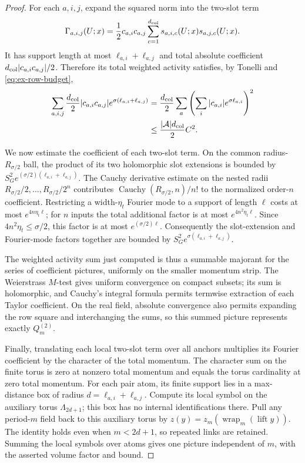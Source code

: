 \begin{proof}
For each $a,i,j$, expand the squared norm into the two-slot term
\[
 \Gamma_{a,i,j}(U;x)=\frac12c_{a,i}c_{a,j}
       \sum_{c=1}^{d_{\rm col}}s_{a,i,c}(U;x)s_{a,j,c}(U;x).
\]
It has support length at most $\ell_{a,i}+\ell_{a,j}$ and total absolute
coefficient $d_{\rm col}|c_{a,i}c_{a,j}|/2$. Therefore its total weighted
activity satisfies, by Tonelli and \eqref{eq:ex-row-budget},
\[
 \begin{aligned}
 \sum_{a,i,j}\frac{d_{\rm col}}2|c_{a,i}c_{a,j}|
          e^{\sigma(\ell_{a,i}+\ell_{a,j})}
 &=\frac{d_{\rm col}}2\sum_a
       \left(\sum_i|c_{a,i}|e^{\sigma\ell_{a,i}}\right)^2\\
 &\leq \frac{|\mathcal A|d_{\rm col}}2C^2.
 \end{aligned}
\]

We now estimate the coefficient of each two-slot term. On the common
radius-$R_{\sigma/2}$ ball, the product of its two holomorphic slot extensions
is bounded by
$S_G^2e^{(\sigma/2)(\ell_{a,i}+\ell_{a,j})}$. The Cauchy derivative
estimate on the nested radii
$R_{\sigma/2}/2,\ldots,R_{\sigma/2}/2^n$ contributes
$\operatorname{Cauchy}(R_{\sigma/2},n)/n!$ to the normalized order-$n$
coefficient. Restricting a width-$\eta_t$ Fourier mode to a support of length
$\ell$ costs at most $e^{4n\eta_t\ell}$; for $n$ inputs the total additional
factor is at most $e^{4n^2\eta_t\ell}$. Since
$4n^2\eta_t\leq\sigma/2$, this factor is at most $e^{(\sigma/2)\ell}$.
Consequently the slot-extension and Fourier-mode factors together are bounded
by $S_G^2e^{\sigma(\ell_{a,i}+\ell_{a,j})}$.

The weighted activity sum just computed is thus a summable majorant for the
series of coefficient pictures, uniformly on the smaller momentum strip.
The Weierstrass $M$-test gives uniform convergence on compact subsets; its sum
is holomorphic, and Cauchy's integral formula permits termwise extraction of
each Taylor coefficient. On the real field, absolute convergence also permits
expanding the row square and interchanging the sums, so this summed picture
represents exactly $Q^{(2)}_m$.

Finally, translating each local two-slot term over all anchors multiplies its
Fourier coefficient by the character of the total momentum. The character sum
on the finite torus is zero at nonzero total momentum and equals the torus
cardinality at zero total momentum. For each pair atom, its finite support lies in a max-distance box of radius
$d=\ell_{a,i}+\ell_{a,j}$. Compute its local symbol on the auxiliary torus
$\Lambda_{2d+1}$; this box has no internal identifications there. Pull any
period-$m$ field back to this auxiliary torus by
$z(y)=z_m(\operatorname{wrap}_m(\operatorname{lift}y))$. The identity holds
even when $m<2d+1$, so repeated links are retained. Summing the local symbols
over atoms gives one picture independent of $m$, with the asserted volume
factor and bound.
\end{proof}

